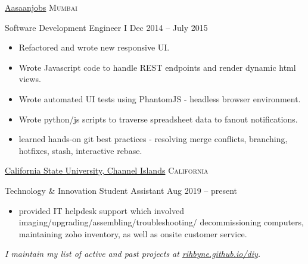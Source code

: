 \documentclass[11pt,a4paper]{article}
\begin{document}
\headedsection
    {\href{https://www.aasaanjobs.com/}{Aasaanjobs}}
    {\textsc{Mumbai}}
    {%
      \headedsubsection
      {Software Development Engineer I}
      {Dec 2014 -- July 2015}
      {
        \begin{itemize}
          \item Refactored and wrote new responsive UI.
          \item Wrote Javascript code to handle REST endpoints and render dynamic html views.
          \item Wrote automated UI tests using PhantomJS - headless browser environment.
          \item Wrote python/js scripts to traverse spreadsheet data to fanout notifications.
          \item learned hands-on git best practices - resolving merge conflicts, branching, hotfixes, stash, interactive rebase.
        \end{itemize}
      }
    }

\headedsection
    {\href{https://www.csuci.edu/}{California State University, Channel Islands}}
    {\textsc{California}}
    {%
      \headedsubsection
      {Technology \& Innovation Student Assistant}
      {Aug 2019 -- present}
      {
        \begin{itemize}
        \item provided IT helpdesk support which involved imaging/upgrading/assembling/troubleshooting/
          decommissioning computers, maintaining zoho inventory, as well as onsite customer service.
        \end{itemize}
      }
    }

\vspace{-0.2em}
\begin{center}
  \emph{\textmd I maintain my list of active and past projects at \href{http://rihbyne.github.io/diy}{rihbyne.github.io/diy}.}
\end{center}


\spacedhrule{-0.2em}{-0.4em}

\end{document}
